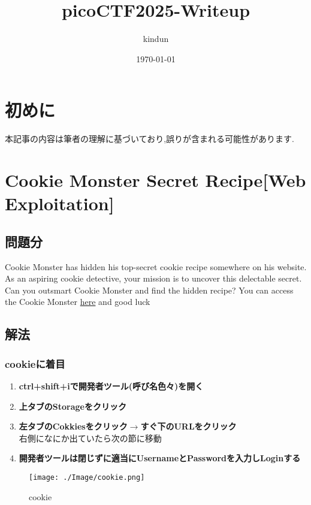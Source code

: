 \documentclass[dvipdfmx]{jsarticle}
\title{picoCTF2025-Writeup}
\author{kindun}
\date{\today}
\begin{document}
\maketitle 

\section{初めに}
本記事の内容は筆者の理解に基づいており,誤りが含まれる可能性があります.

\section{Cookie Monster Secret Recipe[Web Exploitation]}
\subsection{問題分}
Cookie Monster has hidden his top-secret cookie recipe somewhere on his website. As an aspiring cookie detective, your mission is to uncover this delectable secret. Can you outsmart Cookie Monster and find the hidden recipe? You can access the Cookie Monster \href{http://verbal-sleep.picoctf.net:56571/}{here} and good luck

\subsection{解法}
\subsubsection{cookieに着目}
\begin{enumerate}
	\item \textbf{ctrl+shift+iで開発者ツール(呼び名色々)を開く}
	\item \textbf{上タブのStorageをクリック}
	\item \textbf{左タブのCokkiesをクリック$ \xrightarrow{} $すぐ下のURLをクリック}\\
	右側になにか出ていたら次の節に移動
	\item \textbf{開発者ツールは閉じずに適当にUsernameとPasswordを入力しLoginする}
\end{enumerate}

\begin{figure}[h]
\begin{center}
\texttt{[image: ./Image/cookie.png]}
\caption{cookie}
\end{center}
\end{figure}
\end{document}
